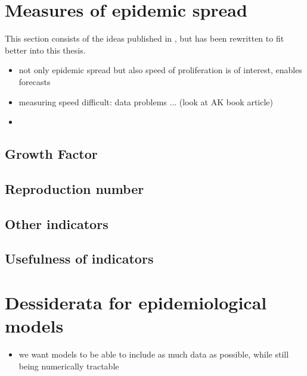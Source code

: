 \section{Measures of epidemic spread}
\label{sec:measures_of_epidemic_spread}
This section consists of the ideas published in \cite{Heyder2023Measures}, but has been rewritten to fit better into this thesis.

\begin{itemize}
    \item not only epidemic spread but also speed of proliferation is of interest, enables forecasts
    \item measuring speed difficult: data problems ... (look at AK book article)
    \item 
\end{itemize}

\subsection{Growth Factor}
\label{subsec:growth_factor}
\subsection{Reproduction number}
\label{subsec:reproduction_number}

\subsection{Other indicators}
\label{subsec:other_indicat}

\subsection{Usefulness of indicators}
\label{subsec:usefulness_of_indicators}


\section{Dessiderata for epidemiological models}
\label{sec:dessiderata}

\begin{itemize}
    \item we want models to be able to include as much data as possible, while still being numerically tractable 
\end{itemize}

